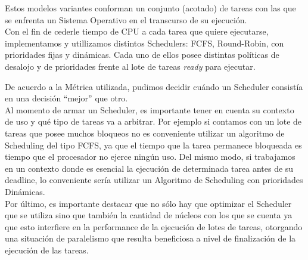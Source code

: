\documentclass[a4paper]{article}
\begin{document}
Estos modelos variantes conforman un conjunto (acotado) de tareas con las que se enfrenta un Sistema Operativo en el transcurso de su ejecuci\'on.\\

Con el fin de cederle tiempo de CPU a cada tarea que quiere ejecutarse, implementamos y utillizamos distintos Schedulers: FCFS, Round-Robin, con prioridades fijas y din\'amicas. Cada uno de ellos posee distintas pol\'iticas de desalojo y de prioridades frente al lote de tareas \emph{ready} para ejecutar.

De acuerdo a la M\'etrica utilizada, pudimos decidir cu\'ando un Scheduler consist\'ia en una decisi\'on ``mejor'' que otro.\\

Al momento de armar un Scheduler, es importante tener en cuenta su contexto de uso y qu\'e tipo de tareas va a arbitrar. Por ejemplo si contamos con un lote de tareas que posee muchos bloqueos no es conveniente utilizar un algoritmo de Scheduling del tipo FCFS, ya que el tiempo que la tarea permanece bloqueada es tiempo que el procesador no ejerce ning\'un uso. Del mismo modo, si trabajamos en un contexto donde es esencial la ejecuci\'on de determinada tarea antes de su deadline, lo conveniente ser\'ia utilizar un Algoritmo de Scheduling con prioridades Din\'amicas.\\


Por \'ultimo, es importante destacar que no s\'olo hay que optimizar el Scheduler que se utiliza sino que tambi\'en la cantidad de n\'ucleos con los que se cuenta ya que esto interfiere en la performance de la ejecuci\'on de lotes de tareas, otorgando una situaci\'on de paralelismo que resulta beneficiosa a nivel de finalizaci\'on de la ejecuci\'on de las tareas. 
\end{document}
